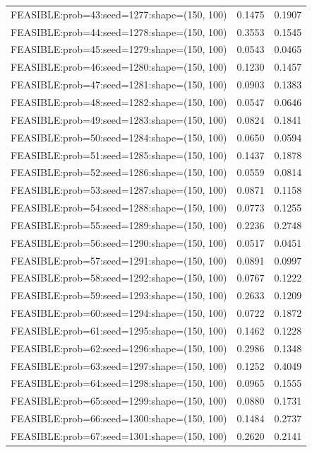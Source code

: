 \begin{longtable}{lcc}
FEASIBLE:prob=43:seed=1277:shape=(150, 100)  &   0.1475 & 0.1907 \\
FEASIBLE:prob=44:seed=1278:shape=(150, 100)  &   0.3553 & 0.1545 \\
FEASIBLE:prob=45:seed=1279:shape=(150, 100)  &   0.0543 & 0.0465 \\
FEASIBLE:prob=46:seed=1280:shape=(150, 100)  &   0.1230 & 0.1457 \\
FEASIBLE:prob=47:seed=1281:shape=(150, 100)  &   0.0903 & 0.1383 \\
FEASIBLE:prob=48:seed=1282:shape=(150, 100)  &   0.0547 & 0.0646 \\
FEASIBLE:prob=49:seed=1283:shape=(150, 100)  &   0.0824 & 0.1841 \\
FEASIBLE:prob=50:seed=1284:shape=(150, 100)  &   0.0650 & 0.0594 \\
FEASIBLE:prob=51:seed=1285:shape=(150, 100)  &   0.1437 & 0.1878 \\
FEASIBLE:prob=52:seed=1286:shape=(150, 100)  &   0.0559 & 0.0814 \\
FEASIBLE:prob=53:seed=1287:shape=(150, 100)  &   0.0871 & 0.1158 \\
FEASIBLE:prob=54:seed=1288:shape=(150, 100)  &   0.0773 & 0.1255 \\
FEASIBLE:prob=55:seed=1289:shape=(150, 100)  &   0.2236 & 0.2748 \\
FEASIBLE:prob=56:seed=1290:shape=(150, 100)  &   0.0517 & 0.0451 \\
FEASIBLE:prob=57:seed=1291:shape=(150, 100)  &   0.0891 & 0.0997 \\
FEASIBLE:prob=58:seed=1292:shape=(150, 100)  &   0.0767 & 0.1222 \\
FEASIBLE:prob=59:seed=1293:shape=(150, 100)  &   0.2633 & 0.1209 \\
FEASIBLE:prob=60:seed=1294:shape=(150, 100)  &   0.0722 & 0.1872 \\
FEASIBLE:prob=61:seed=1295:shape=(150, 100)  &   0.1462 & 0.1228 \\
FEASIBLE:prob=62:seed=1296:shape=(150, 100)  &   0.2986 & 0.1348 \\
FEASIBLE:prob=63:seed=1297:shape=(150, 100)  &   0.1252 & 0.4049 \\
FEASIBLE:prob=64:seed=1298:shape=(150, 100)  &   0.0965 & 0.1555 \\
FEASIBLE:prob=65:seed=1299:shape=(150, 100)  &   0.0880 & 0.1731 \\
FEASIBLE:prob=66:seed=1300:shape=(150, 100)  &   0.1484 & 0.2737 \\
FEASIBLE:prob=67:seed=1301:shape=(150, 100)  &   0.2620 & 0.2141 \\

\end{longtable}
